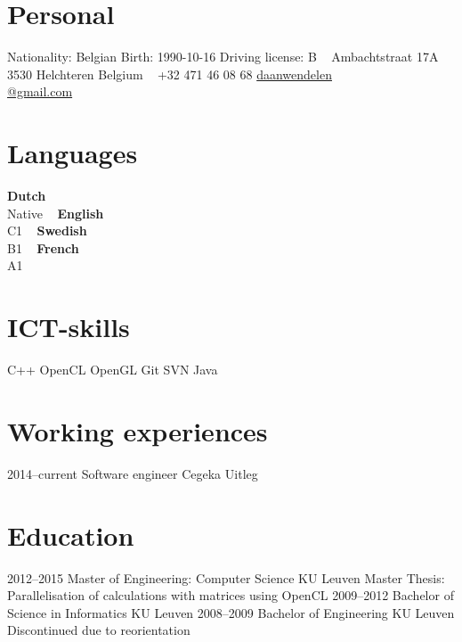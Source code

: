 \documentclass[]{friggeri-cv} %
\begin{document}


\begin{aside} %
\section{Personal}
Nationality: Belgian
Birth: 1990-10-16
Driving license: B
~
Ambachtstraat 17A
3530 Helchteren
Belgium
~
+32 471 46 08 68
\href{mailto:daanwendelen@gmail.com}{daanwendelen\\@gmail.com}
\section{Languages}
\textbf{Dutch}\\Native
~
\textbf{English}\\C1
~
\textbf{Swedish}\\B1
~
\textbf{French}\\A1
\section{ICT-skills}
C++
OpenCL
OpenGL
Git
SVN
Java
\end{aside}

\section{Working experiences}
\begin{entrylist}
\entry
{2014--current}
{Software engineer}
{Cegeka}
{Uitleg}
\end{entrylist}

\section{Education}

\begin{entrylist}
\entry
{2012--2015}
{Master of Engineering: Computer Science}
{KU Leuven}
{Master Thesis: Parallelisation of calculations with matrices using OpenCL}
\entry
{2009--2012}
{Bachelor of Science in Informatics}
{KU Leuven}
{}
\entry
{2008--2009}
{Bachelor of Engineering}
{KU Leuven}
{Discontinued due to reorientation}
\end{entrylist}
\end{document}
